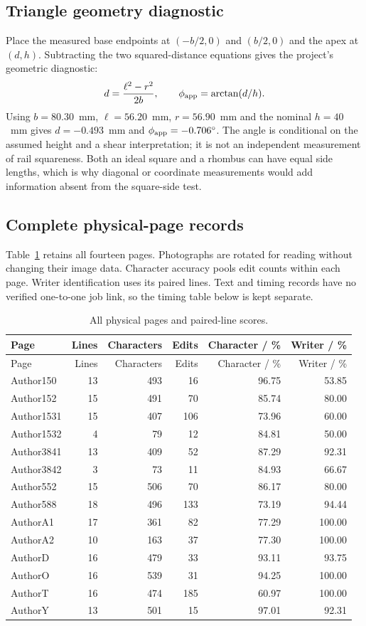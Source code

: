 \subsection{Triangle geometry diagnostic}\label{app:res-geometry-calculation}
Place the measured base endpoints at $(-b/2,0)$ and $(b/2,0)$ and the apex at $(d,h)$. Subtracting the two squared-distance equations gives the project's geometric diagnostic:
\begin{equation}
d=\frac{\ell^2-r^2}{2b},\qquad \phi_{\rm app}=\arctan(d/h).
\label{eq:res-apex}
\end{equation}
Using $b=80.30$~mm, $\ell=56.20$~mm, $r=56.90$~mm and the nominal $h=40$~mm gives $d=-0.493$~mm and $\phi_{\rm app}=-0.706^\circ$. The angle is conditional on the assumed height and a shear interpretation; it is not an independent measurement of rail squareness. Both an ideal square and a rhombus can have equal side lengths, which is why diagonal or coordinate measurements would add information absent from the square-side test.


\subsection{Complete physical-page records}\label{app:res-page-records}
Table~\ref{tab:app-pages} retains all fourteen pages. Photographs are rotated for reading without changing their image data. Character accuracy pools edit counts within each page. Writer identification uses its paired lines. Text and timing records have no verified one-to-one job link, so the timing table below is kept separate.
\begin{longtable}{lrrrrr}
\caption{All physical pages and paired-line scores.}\label{tab:app-pages}\\
\toprule Page & Lines & Characters & Edits & Character / \% & Writer / \%\\\midrule\endfirsthead
\toprule Page & Lines & Characters & Edits & Character / \% & Writer / \%\\\midrule\endhead
Author150 & 13 & 493 & 16 & 96.75 & 53.85\\
Author152 & 15 & 491 & 70 & 85.74 & 80.00\\
Author1531 & 15 & 407 & 106 & 73.96 & 60.00\\
Author1532 & 4 & 79 & 12 & 84.81 & 50.00\\
Author3841 & 13 & 409 & 52 & 87.29 & 92.31\\
Author3842 & 3 & 73 & 11 & 84.93 & 66.67\\
Author552 & 15 & 506 & 70 & 86.17 & 80.00\\
Author588 & 18 & 496 & 133 & 73.19 & 94.44\\
AuthorA1 & 17 & 361 & 82 & 77.29 & 100.00\\
AuthorA2 & 10 & 163 & 37 & 77.30 & 100.00\\
AuthorD & 16 & 479 & 33 & 93.11 & 93.75\\
AuthorO & 16 & 539 & 31 & 94.25 & 100.00\\
AuthorT & 16 & 474 & 185 & 60.97 & 100.00\\
AuthorY & 13 & 501 & 15 & 97.01 & 92.31\\
\bottomrule\end{longtable}

